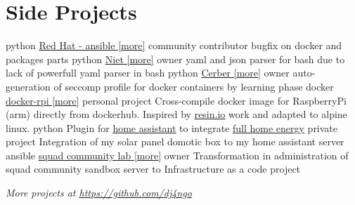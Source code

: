 \documentclass[]{friggeri-cv}
\begin{document}
\section{Side Projects}
\begin{entrylist}
    \entry
        {python}
	{\href{https://github.com/ansible/ansible}{Red Hat - ansible [\underline{more}]}}
        {community contributor}
        {bugfix on docker and packages parts}
    \entry
        {python}
        {\href{https://github.com/gr0und-s3ct0r/niet}{Niet [\underline{more}]}}
        {owner}
        {yaml and json parser for bash due to lack of powerfull yaml parser in bash}
    \entry
        {python}
        {\href{https://github.com/gr0und-s3ct0r/cerber}{Cerber [\underline{more}]}}
        {owner}
        {auto-generation of seccomp profile for docker containers by learning phase}
    \entry
        {docker}
	{\href{https://github.com/dj4ngo/docker-rpi-alpine-scratch}{docker-rpi [\underline{more}]}}
        {personal project}
	{Cross-compile docker image for RaspberryPi (arm) directly from dockerhub. Inspired by 
	\href{https://resin.io/blog/building-arm-containers-on-any-x86-machine-even-dockerhub/}{\underline{resin.io}}
	work and adapted to alpine linux.}
    \entry
        {python}
	{Plugin for
	\href{https://www.home-assistant.io/}{\underline{home assistant}}
	to integrate
	\href{http://www.full-home-energy.com/}{\underline{full home energy}}}
        {private project}
	{Integration of my solar panel domotic box to my home assistant server}
    \entry
        {ansible}
        {\href{https://gitlab.com/squad-lcv/labo}{squad community lab [\underline{more}]}}
	{owner}
        {Transformation in administration of squad community sandbox server to Infrastructure as a code project}
\end{entrylist}


\begin{flushright}
	\emph{More projects at 
	\href{https://github.com/dj4ngo}{\underline{https://github.com/dj4ngo}}}
\end{flushright}
%
%
\end{document}
